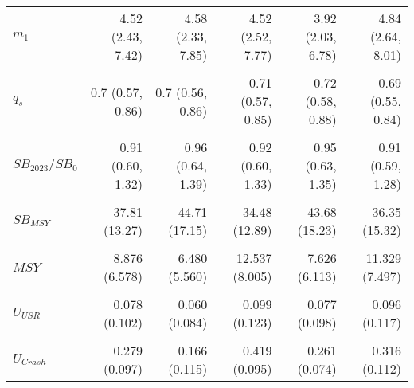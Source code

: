 \documentclass[11pt]{book}
\begin{document}
\begin{table}[!h]
{\begin{tabular}[t]{lrrrrr}
\addlinespace
$m_1$ & 4.52 (2.43, 7.42) & 4.58 (2.33, 7.85) & 4.52 (2.52, 7.77) & 3.92 (2.03, 6.78) & 4.84 (2.64, 8.01)\\
\cellcolor{gray!10}{$\overline{M}$} & \cellcolor{gray!10}{0.6 (0.57, 0.63)} & \cellcolor{gray!10}{0.6 (0.57, 0.64)} & \cellcolor{gray!10}{0.6 (0.57, 0.64)} & \cellcolor{gray!10}{0.59 (0.56, 0.63)} & \cellcolor{gray!10}{0.61 (0.58, 0.64)}\\
$q_s$ & 0.7 (0.57, 0.86) & 0.7 (0.56, 0.86) & 0.71 (0.57, 0.85) & 0.72 (0.58, 0.88) & 0.69 (0.55, 0.84)\\
\cellcolor{gray!10}{$SB_{2023}$} & \cellcolor{gray!10}{84.54 (55.46, 122.08)} & \cellcolor{gray!10}{84.35 (56.53, 122.32)} & \cellcolor{gray!10}{84.64 (54.64, 121.94)} & \cellcolor{gray!10}{84.56 (56.45, 119.75)} & \cellcolor{gray!10}{83.36 (54.37, 118.02)}\\
$SB_{2023}/SB_0$ & 0.91 (0.60, 1.32) & 0.96 (0.64, 1.39) & 0.92 (0.60, 1.33) & 0.95 (0.63, 1.35) & 0.91 (0.59, 1.28)\\
\addlinespace
\cellcolor{gray!10}{$P(SB_{2023} > 0.3 SB_0)$} & \cellcolor{gray!10}{1} & \cellcolor{gray!10}{1} & \cellcolor{gray!10}{1} & \cellcolor{gray!10}{1} & \cellcolor{gray!10}{1}\\
$SB_{MSY}$ & 37.81 (13.27) & 44.71 (17.15) & 34.48 (12.89) & 43.68 (18.23) & 36.35 (15.32)\\
\cellcolor{gray!10}{$U_{MSY}$} & \cellcolor{gray!10}{0.185 (0.077)} & \cellcolor{gray!10}{0.122 (0.066)} & \cellcolor{gray!10}{0.261 (0.079)} & \cellcolor{gray!10}{0.145 (0.063)} & \cellcolor{gray!10}{0.229 (0.072)}\\
$MSY$ & 8.876 (6.578) & 6.480 (5.560) & 12.537 (8.005) & 7.626 (6.113) & 11.329 (7.497)\\
\cellcolor{gray!10}{$USR$} & \cellcolor{gray!10}{67.18 (60.08, 75.49)} & \cellcolor{gray!10}{67.37 (60.38, 76.1)} & \cellcolor{gray!10}{67.46 (60.7, 75.8)} & \cellcolor{gray!10}{66.29 (59.15, 75.4)} & \cellcolor{gray!10}{68.4 (61.21, 77.83)}\\
\addlinespace
$U_{USR}$ & 0.078 (0.102) & 0.060 (0.084) & 0.099 (0.123) & 0.077 (0.098) & 0.096 (0.117)\\
\cellcolor{gray!10}{$Y_{USR}$} & \cellcolor{gray!10}{5.774 (7.848)} & \cellcolor{gray!10}{4.390 (6.444)} & \cellcolor{gray!10}{7.511 (10.040)} & \cellcolor{gray!10}{5.627 (7.455)} & \cellcolor{gray!10}{7.402 (9.393)}\\
$U_{Crash}$ & 0.279 (0.097) & 0.166 (0.115) & 0.419 (0.095) & 0.261 (0.074) & 0.316 (0.112)\\
\bottomrule
\end{tabular}}
\end{table}
\end{document}
